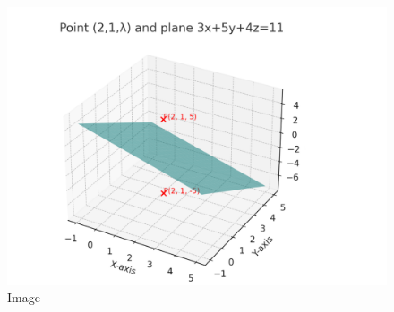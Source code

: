 \documentclass[journal]{IEEEtran}
\begin{document}
\begin{figure}[H]
    \centering
    \includegraphics[width=0.90\linewidth]{figs/image.png}
    \caption{Image}
    \label{fig:placeholder}
\end{figure}
\end{document}
